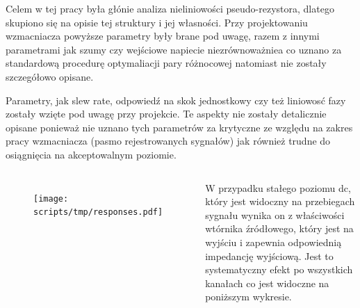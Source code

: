 \begin{frame}[t]
    \vspace{-1em}
    \begin{block}{\dk}
        {\renewcommand\normalsize{\small}%
        \normalsize
        }
    \end{block}
    {\renewcommand\normalsize{\small}%
    \normalsize
Celem w tej pracy była głónie analiza nieliniowości pseudo-rezystora, dlatego skupiono się na opisie tej struktury i jej własności.  Przy projektowaniu wzmacniacza powyższe  parametry  były brane pod uwagę, razem z innymi parametrami jak szumy czy wejściowe napiecie niezrównoważniea co uznano za standardową procedurę optymaliacji pary różnocowej natomiast nie zostały szczegółowo opisane.


Parametry,  jak slew rate, odpowiedź na skok jednostkowy czy też liniowosć fazy zostały wzięte pod uwagę przy projekcie. Te aspekty nie zostały detalicznie opisane ponieważ nie uznano tych parametrów za krytyczne ze względu na zakres pracy wzmacniacza (pasmo rejestrowanych sygnałów) jak również trudne do osiągnięcia na akceptowalnym poziomie. 
    }
\end{frame}

\begin{frame}[t]
    \begin{columns}

\vspace{-1em}
        \begin{figure}
            \centering
            \texttt{[image: scripts/tmp/responses.pdf]}
        \end{figure}
        W przypadku stałego poziomu dc, który jest widoczny na przebiegach sygnału wynika on z właściwości wtórnika źródłowego, który jest na wyjściu i zapewnia odpowiednią impedancję wyjściową. Jest to systematyczny efekt po wszystkich kanałach co jest widoczne na poniższym wykresie. 

    \end{columns}


\end{frame}



